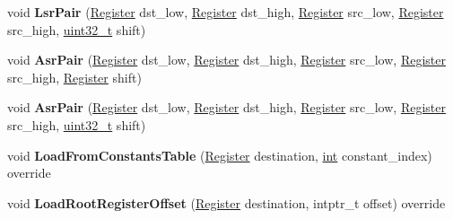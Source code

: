 \begin{DoxyCompactItemize}
\item 
\mbox{\label{classv8_1_1internal_1_1TurboAssembler_a2d0701f0862673a5ab66553ab246496b}} 
void {\bfseries Lsr\+Pair} (\mbox{\hyperlink{classv8_1_1internal_1_1Register}{Register}} dst\+\_\+low, \mbox{\hyperlink{classv8_1_1internal_1_1Register}{Register}} dst\+\_\+high, \mbox{\hyperlink{classv8_1_1internal_1_1Register}{Register}} src\+\_\+low, \mbox{\hyperlink{classv8_1_1internal_1_1Register}{Register}} src\+\_\+high, \mbox{\hyperlink{classuint32__t}{uint32\+\_\+t}} shift)
\item 
\mbox{\label{classv8_1_1internal_1_1TurboAssembler_ac67017e5290f95454977ed552f3671f2}} 
void {\bfseries Asr\+Pair} (\mbox{\hyperlink{classv8_1_1internal_1_1Register}{Register}} dst\+\_\+low, \mbox{\hyperlink{classv8_1_1internal_1_1Register}{Register}} dst\+\_\+high, \mbox{\hyperlink{classv8_1_1internal_1_1Register}{Register}} src\+\_\+low, \mbox{\hyperlink{classv8_1_1internal_1_1Register}{Register}} src\+\_\+high, \mbox{\hyperlink{classv8_1_1internal_1_1Register}{Register}} shift)
\item 
\mbox{\label{classv8_1_1internal_1_1TurboAssembler_a5c3d971380c70554208f350294f2ee11}} 
void {\bfseries Asr\+Pair} (\mbox{\hyperlink{classv8_1_1internal_1_1Register}{Register}} dst\+\_\+low, \mbox{\hyperlink{classv8_1_1internal_1_1Register}{Register}} dst\+\_\+high, \mbox{\hyperlink{classv8_1_1internal_1_1Register}{Register}} src\+\_\+low, \mbox{\hyperlink{classv8_1_1internal_1_1Register}{Register}} src\+\_\+high, \mbox{\hyperlink{classuint32__t}{uint32\+\_\+t}} shift)
\item 
\mbox{\label{classv8_1_1internal_1_1TurboAssembler_a6c8fae865ac1fd7f79f9d4934a46392a}} 
void {\bfseries Load\+From\+Constants\+Table} (\mbox{\hyperlink{classv8_1_1internal_1_1Register}{Register}} destination, \mbox{\hyperlink{classint}{int}} constant\+\_\+index) override
\item 
\mbox{\label{classv8_1_1internal_1_1TurboAssembler_a20588856c39f30350ccd570332e761ea}} 
void {\bfseries Load\+Root\+Register\+Offset} (\mbox{\hyperlink{classv8_1_1internal_1_1Register}{Register}} destination, intptr\+\_\+t offset) override

\end{DoxyCompactItemize}
